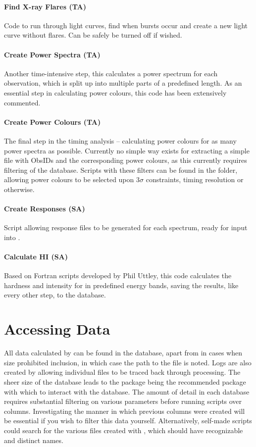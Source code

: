 \paragraph{Find X-ray Flares (TA)} Code to run through light curves, find when bursts occur and create a new light curve without flares. Can be safely be turned off if wished.

\paragraph{Create Power Spectra (TA)} Another time-intensive step, this calculates a power spectrum for each observation, which is split up into multiple parts of a predefined length. As an essential step in calculating power colours, this code has been extensively commented.

\paragraph{Create Power Colours (TA)} The final step in the timing analysis -- calculating power colours for as many power spectra as possible. Currently no simple way exists for extracting a simple file with ObsIDs and the corresponding power colours, as this currently requires filtering of the database. Scripts with these filters can be found in the  folder, allowing power colours to be selected upon 3$\sigma$ constraints, timing resolution or otherwise.

\paragraph{Create Responses (SA)} Script allowing response files to be generated for each spectrum, ready for input into .

\paragraph{Calculate HI (SA)} Based on Fortran scripts developed by Phil Uttley, this code calculates the hardness and intensity for in predefined energy bands, saving the results, like every other step, to the database.

\section*{Accessing Data}
All data calculated by \chromos can be found in the database, apart from in cases when size prohibited inclusion, in which case the path to the file is noted. Logs are also created by \chromos allowing individual files to be traced back through processing. The sheer size of the database leads to the  package being the recommended package with which to interact with the database. The amount of detail in each database requires substantial filtering on various parameters before running scripts over columns. Investigating the manner in which previous columns were created will be essential if you wish to filter this data yourself. Alternatively, self-made scripts could search for the various files created with \chromos, which should have recognizable and distinct names.

